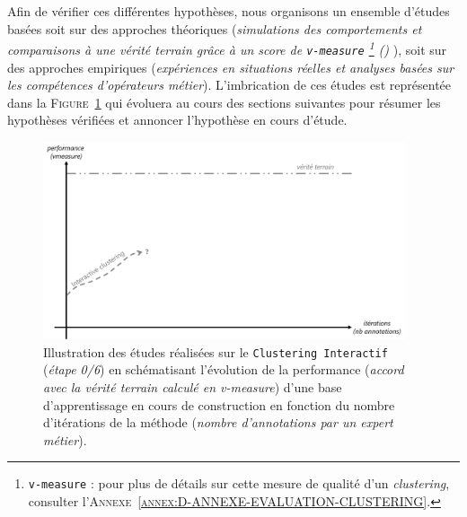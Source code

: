 	Afin de vérifier ces différentes hypothèses, nous organisons un ensemble d'études basées soit sur des approches théoriques (\textit{simulations des comportements et comparaisons à une vérité terrain grâce à un score de \texttt{v-measure} \footnote{
		\texttt{v-measure} : pour plus de détails sur cette mesure de qualité d'un \textit{clustering}, consulter l'\textsc{Annexe~\ref{annex:D-ANNEXE-EVALUATION-CLUSTERING}}.
	} (\cite{rosenberg-hirschberg:2007:vmeasure-conditional-entropybased}) } ), soit sur des approches empiriques (\textit{expériences en situations réelles et analyses basées sur les compétences d'opérateurs métier}).
	L'imbrication de ces études est représentée dans la \textsc{Figure~\ref{figure:4.0-HYPOTHESE-00-DEFAULT}} qui évoluera au cours des sections suivantes pour résumer les hypothèses vérifiées et annoncer l'hypothèse en cours d'étude.
	\begin{figure}[!htb]
		\centering
		\includegraphics[width=0.95\textwidth]{figures/hypotheses-00-default}
		\caption{
			Illustration des études réalisées sur le \texttt{Clustering Interactif} (\textit{étape 0/6}) en schématisant l'évolution de la performance (\textit{accord avec la vérité terrain calculé en v-measure}) d'une base d'apprentissage en cours de construction en fonction du nombre d'itérations de la méthode (\textit{nombre d'annotations par un expert métier}).
		}
		\label{figure:4.0-HYPOTHESE-00-DEFAULT}
	\end{figure}
		
